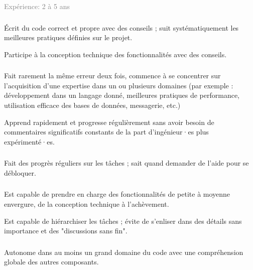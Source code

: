 \documentclass[a4paper, french, openany, 12pt]{book}
\newcommand\dex{\textcolor{BrickRed}{\textbf{\bsc{Dex}}}}
\newcommand\str{\textcolor{DarkOrchid}{\textbf{\bsc{Str}}}}
\newcommand\wis{\textcolor{MidnightBlue}{\textbf{\bsc{Wis}}}}
\newcommand\xp[1]{\textcolor{Gray}{Expérience: {#1} ans}}
\begin{document}
\xp{2 à 5}

\subsubsection*{\dex}

Écrit du code correct et propre avec des conseils ; suit systématiquement les meilleures pratiques définies sur le
projet.

Participe à la conception technique des fonctionnalités avec des conseils.

\subsubsection*{\dex}

Fait rarement la même erreur deux fois, commence à se concentrer sur l'acquisition d'une expertise dans un ou plusieurs 
domaines (par exemple : développement dans un langage donné, meilleures pratiques de performance, utilisation efficace 
des bases de données, messagerie, etc.)

Apprend rapidement et progresse régulièrement sans avoir besoin de commentaires significatifs constants de la part 
d'ingénieur·es plus expérimenté·es.

\subsubsection*{\str}

Fait des progrès réguliers sur les tâches ; sait quand demander de l'aide pour se débloquer.

\subsubsection*{\str}

Est capable de prendre en charge des fonctionnalités de petite à moyenne envergure, de la conception technique à 
l'achèvement.

Est capable de hiérarchiser les tâches ; évite de s'enliser dans des détails sans importance et des "discussions sans 
fin".

\subsubsection*{\wis}

Autonome dans au moins un grand domaine du code avec une compréhension globale des autres composants.

\subsubsection*{\wis}
\end{document}
